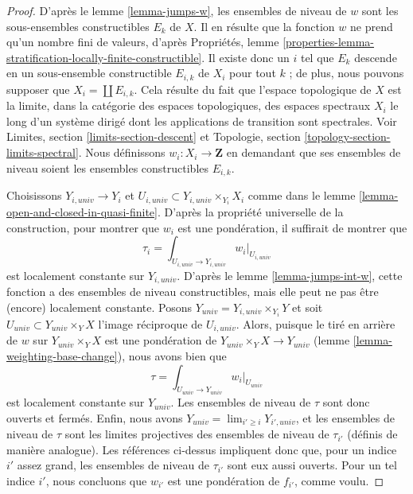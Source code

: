 \begin{proof}
D'après le lemme \ref{lemma-jumps-w}, les ensembles de niveau de $w$ sont les sous-ensembles constructibles
$E_k$ de $X$. Il en résulte que la fonction $w$ ne prend qu'un nombre fini
de valeurs, d'après Propriétés, lemme
\ref{properties-lemma-stratification-locally-finite-constructible}.
Il existe donc un $i$ tel que $E_k$ descende en un sous-ensemble
constructible $E_{i, k}$ de $X_i$ pour tout $k$ ; de plus, nous pouvons supposer que
$X_i = \coprod E_{i, k}$. Cela résulte du fait que l'espace topologique
de $X$ est la limite, dans la catégorie des espaces topologiques,
des espaces spectraux $X_i$ le long d'un système dirigé dont les
applications de transition sont spectrales. Voir
Limites, section \ref{limits-section-descent}
et
Topologie, section \ref{topology-section-limits-spectral}.
Nous définissons $w_i : X_i \to \mathbf{Z}$ en demandant que ses ensembles
de niveau soient les ensembles constructibles $E_{i, k}$.

\medskip\noindent
Choisissons $Y_{i, univ} \to Y_i$ et
$U_{i, univ} \subset Y_{i, univ} \times_{Y_i} X_i$
comme dans le lemme \ref{lemma-open-and-closed-in-quasi-finite}.
D'après la propriété universelle de la construction, pour
montrer que $w_i$ est une pondération, il suffirait de montrer
que
$$
\tau_i = \textstyle{\int}_{U_{i, univ} \to Y_{i, univ}} w_i|_{U_{i, univ}}
$$
est localement constante sur $Y_{i, univ}$. D'après le lemme \ref{lemma-jumps-int-w},
cette fonction a des ensembles de niveau constructibles, mais elle peut
ne pas être (encore) localement constante. Posons
$Y_{univ} = Y_{i, univ} \times_{Y_i} Y$
et soit $U_{univ} \subset Y_{univ} \times_Y X$
l'image réciproque de $U_{i, univ}$.
Alors, puisque le tiré en arrière de $w$ sur $Y_{univ} \times_Y X$
est une pondération de $Y_{univ} \times_Y X \to Y_{univ}$
(lemme \ref{lemma-weighting-base-change}),
nous avons bien que
$$
\tau = \textstyle{\int}_{U_{univ} \to Y_{univ}} w_i|_{U_{univ}}
$$
est localement constante sur $Y_{univ}$. Les ensembles de niveau de
$\tau$ sont donc ouverts et fermés. Enfin, nous avons
$Y_{univ} = \lim_{i' \geq i} Y_{i', univ}$,
et les ensembles de niveau de $\tau$ sont les limites projectives des
ensembles de niveau de $\tau_{i'}$ (définis de manière analogue).
Les références ci-dessus impliquent donc que, pour un indice
$i'$ assez grand, les ensembles de niveau de $\tau_{i'}$ sont eux aussi ouverts.
Pour un tel indice $i'$, nous concluons que $w_{i'}$
est une pondération de $f_{i'}$, comme voulu.
\end{proof}







